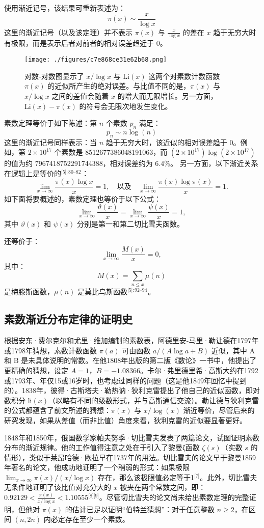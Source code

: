 使用渐近记号，该结果可重新表述为：
$$
\pi(x) \sim \frac{x}{\log x}~
$$
这里的渐近记号（以及该定理）并不表示 $\pi(x)$ 与 $\frac{x}{\log x}$ 的差在 $x$ 趋于无穷大时有极限，而是表示后者对前者的相对误差趋近于 0。
\begin{figure}[ht]
\centering
\texttt{[image: ./figures/c7e868ce31e62b68.png]}
\caption{对数-对数图显示了 $x / \log x$ 与 $\mathrm{Li}(x)$ 这两个对素数计数函数 $\pi(x)$ 的近似所产生的绝对误差。与比值不同的是，$\pi(x)$ 与 $x / \log x$ 之间的差值会随着 $x$ 的增大而无限增长。另一方面，$\mathrm{Li}(x) - \pi(x)$ 的符号会无限次地发生变化。} \label{fig_SDL_2}
\end{figure}
素数定理等价于如下陈述：第 $n$ 个素数 $p_n$ 满足：
$$
p_n \sim n \log(n)~
$$
这里的渐近记号同样表示：当 $n$ 趋于无穷大时，该近似的相对误差趋于 0。例如，第 $2 \times 10^{17}$ 个素数是 8512677386048191063，而 $(2 \times 10^{17}) \log(2 \times 10^{17})$ 的值为约 7967418752291744388，相对误差约为 6.4\%。
另一方面，以下渐近关系在逻辑上是等价的\(^\text{[5]: 80–82 }\)：
$$
\lim_{x \to \infty} \frac{\pi(x) \log x}{x} = 1, \quad \text{以及} \quad \lim_{x \to \infty} \frac{\pi(x) \log \pi(x)}{x} = 1.~
$$
如下面将要概述的，素数定理也等价于以下公式：
$$
\lim_{x \to \infty} \frac{\vartheta(x)}{x} = \lim_{x \to \infty} \frac{\psi(x)}{x} = 1,~
$$
其中 $\vartheta(x)$ 和 $\psi(x)$ 分别是第一和第二切比雪夫函数。

还等价于：
$$
\lim_{x \to \infty} \frac{M(x)}{x} = 0,~
$$
其中：
$$
M(x) = \sum_{n \leq x} \mu(n)~
$$
是梅滕斯函数，$\mu(n)$ 是莫比乌斯函数\(^\text{[5]: 92–94 }\)。
\subsection{素数渐近分布定律的证明史}
根据安东·费尔克尔和尤里·维加编制的素数表，阿德里安-马里·勒让德在1797年或1798年猜想，素数计数函数 $\pi(a)$ 可由函数 $a / (A \log a + B)$ 近似，其中 A 和 B 是未具体说明的常数。在他1808年出版的第二版《数论》一书中，他提出了更精确的猜想，设定 $A = 1$，$B = -1.08366$。卡尔·弗里德里希·高斯大约在1792或1793年、年仅15或16岁时，也考虑过同样的问题（这是他1849年回忆中提到的）。1838年，彼得·古斯塔夫·勒热讷·狄利克雷提出了他自己的近似函数，即对数积分 $\mathrm{li}(x)$（以略有不同的级数形式，并与高斯通信交流）。勒让德与狄利克雷的公式都蕴含了前文所述的猜想：$\pi(x)$ 与 $x / \log(x)$ 渐近等价，尽管后来的研究发现，如果从差值（而非比值）角度来看，狄利克雷的近似要显著更好。

1848年和1850年，俄国数学家帕夫努季·切比雪夫发表了两篇论文，试图证明素数分布的渐近规律。他的工作值得注意之处在于引入了黎曼ζ函数 $\zeta(s)$（实数 $s$ 的情形），类似于莱昂哈德·欧拉早在1737年的用法。切比雪夫的论文早于黎曼1859年著名的论文，他成功地证明了一个稍弱的形式：如果极限 $\lim_{x \to \infty} \pi(x) / (x / \log x)$ 存在，那么该极限值必定等于1\(^\text{[7]}\)。此外，切比雪夫无条件地证明了该比值对充分大的 $x$ 被夹在两个常数之间，即：$0.92129 < \frac{\pi(x)}{x / \log x} < 1.10555$\(^\text{[8][9]}\)。尽管切比雪夫的论文尚未给出素数定理的完整证明，但他对 $\pi(x)$ 的估计已足以证明“伯特兰猜想”：对于任意整数 $n \geq 2$，在区间 $(n, 2n)$ 内必定存在至少一个素数。

